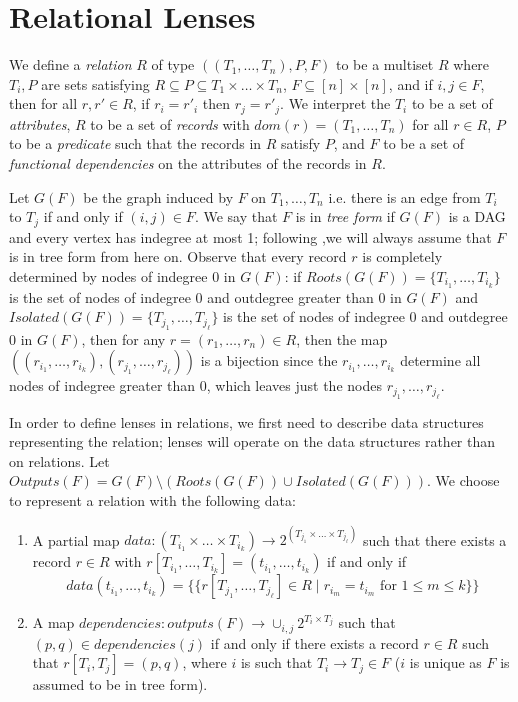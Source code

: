 \documentclass[acmsmall,review,anonymous]{acmart}\settopmatter{printfolios=true,printccs=false,printacmref=false}
\theoremstyle{definition}
\begin{document}
\section{Relational Lenses}
We define a {\em relation} $R$ of type $((T_1, \ldots, T_n), P, F)$ to be a
multiset $R$ where $T_i, P$ are sets satisfying $R \subseteq P \subseteq T_1
\times \ldots \times T_n$, $F \subseteq [n] \times [n]$, and if $i, j \in F$,
then for all $r, r' \in R$, if $r_i = r'_i$ then $r_j = r'_j$. We interpret the
$T_i$ to be a set of {\em attributes}, $R$ to be a set of {\em records} with
$dom(r) = (T_1, \ldots, T_n)$ for all $r \in R$, $P$ to be a {\em predicate}
such that the records in $R$ satisfy $P$, and $F$ to be a set of {\em
functional dependencies} on the attributes of the records in $R$.

Let $G(F)$ be the graph induced by $F$ on $T_1, \ldots, T_n$ i.e. there is an
edge from $T_i$ to $T_j$ if and only if $(i, j) \in F$. We say that $F$ is
in {\em tree form} if $G(F)$ is a DAG and every vertex has indegree at most 1;
following \cite{bohannon2006relational},we will always assume that $F$ is in
tree form from here on. Observe that every record $r$ is completely determined
by nodes of indegree 0 in $G(F)$: if $Roots(G(F)) = \{T_{i_1}, \ldots,
T_{i_k}\}$ is the set of nodes of indegree 0 and outdegree greater than 0 in
$G(F)$ and $Isolated(G(F)) = \{T_{j_1}, \ldots, T_{j_\ell}\}$ is the set of
nodes of indegree 0 and outdegree 0 in $G(F)$, then for any $r = (r_1, \ldots,
r_n)\in R$, then the map $((r_{i_1}, \ldots, r_{i_k}), (r_{j_1}, \ldots,
r_{j_\ell}))$ is a bijection since the $r_{i_1}, \ldots, r_{i_k}$ determine all
nodes of indegree greater than 0, which leaves just the nodes $r_{j_1}, \ldots,
r_{j_\ell}$.

In order to define lenses in relations, we first need to describe data
structures representing the relation; lenses will operate on the data
structures rather than on relations. Let $Outputs(F) = G(F) \setminus
(Roots(G(F)) \cup Isolated(G(F)))$. We choose to represent a relation with the
following data:
\begin{enumerate}
  \item
  A partial map $data : (T_{i_1} \times \ldots \times T_{i_k})
  \longrightarrow 2^{(T_{j_1} \times \ldots \times T_{j_{\ell}})}$ such that
  there exists a record $r \in R$ with $r[T_{i_1}, \ldots, T_{i_k}] =
  (t_{i_1}, \ldots, t_{i_k})$ if and only if
  $$data(t_{i_1}, \ldots, t_{i_k}) =  \{\{r[T_{j_1}, \ldots, T_{j_{\ell}}] \in
  R \; | \; r_{i_m} = t_{i_m} \text{ for }1 \leq m \leq k\}\}$$
  \item
  A map $dependencies : outputs(F) \longrightarrow \cup_{i,j} 2^{T_i \times
  T_j}$ such that $(p, q) \in dependencies(j)$ if and only if there exists a
  record $r \in R$ such that $r[T_i, T_j] = (p, q)$, where $i$ is such that
  $T_i \longrightarrow T_j \in F$ ($i$ is unique as $F$ is assumed to be in tree
  form).
\end{enumerate}
\end{document}
